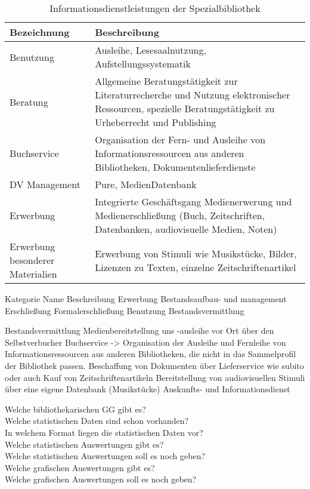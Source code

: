 \begin{table}[h]
    \centering
    \begin{adjustbox}{max width=\textwidth}
    \begin{tabular}{ll}
       \toprule
       \textbf{Bezeichnung}& \textbf{Beschreibung}\\
       \midrule
        Benutzung   &Ausleihe, Lesesaalnutzung, Aufstellungssystematik\\
        Beratung    &Allgemeine Beratungstätigkeit zur Literaturrecherche und Nutzung elektronischer Ressourcen, spezielle Beratungstätigkeit zu Urheberrecht und Publishing\\
        Buchservice &Organisation der Fern- und Ausleihe von Informationsressourcen aus anderen Bibliotheken, Dokumentenlieferdienste\\
        DV Management   &Pure, MedienDatenbank\\
        Erwerbung                           &Integrierte Geschäftsgang Medienerwerung und Medienerschließung (Buch, Zeitschriften, Datenbanken, audiovisuelle Medien, Noten)\\
        Erwerbung besonderer Materialien    &Erwerbung von Stimuli wie Musikstücke, Bilder, Lizenzen zu Texten, einzelne Zeitschriftenartikel\\
         
       \bottomrule
    \end{tabular}
    \end{adjustbox}
    \caption{%
        Informationsdienstleistungen der Spezialbibliothek
    }
    \label{tab:Informationsdienstleistungen}
    \end{table}

Kategorie           Name                                Beschreibung
Erwerbung           Bestandsaufbau- und management
Erschließung        Formalerschließung
Benutzung           Bestandsvermittlung


Bestandsvermittlung Medienbereitstellung uns -ausleihe vor Ort über den Selbstverbucher
Buchservice -> Organisation der Ausleihe und Fernleihe von Informationsressourcen aus anderen Bibliotheken, die nicht in das Sammelprofil der Bibliothek passen. 
    Beschaffung von Dokumenten über Lieferservice wie subito
    oder auch Kauf von Zeitschriftenartikeln
Bereitstellung von audiovisuellen Stimuli über eine eigene Datenbank (Musikstücke)
Auskunfts- und Informationsdienst



Welche bibliothekarischen GG gibt es?\\
Welche statistischen Daten sind schon vorhanden?\\
In welchem Format liegen die statistischen Daten vor?\\
Welche statistischen Auswertungen gibt es?\\
Welche statistischen Auswertungen soll es noch geben?\\
Welche grafischen Auswertungen gibt es?\\
Welche grafischen Auswertungen soll es noch geben?

